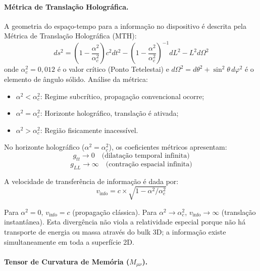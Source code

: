 \documentclass[12pt,a4paper]{article}
\newcommand{\alphaii}{\alpha^2}
\newcommand{\alphac}{\alpha^2_c}
\begin{document}
\paragraph{Métrica de Translação Holográfica.}

A geometria do espaço-tempo para a informação no dispositivo é
descrita pela Métrica de Translação Holográfica (MTH):
\begin{equation}
ds^2 = \left(1 - \frac{\alphaii}{\alphac}\right) c^2 dt^2
  - \left(1 - \frac{\alphaii}{\alphac}\right)^{-1} dL^2
  - L^2 d\Omega^2
\label{eq:metrica}
\end{equation}
onde $\alphac = 0{,}012$ é o valor crítico (Ponto Tetelestai)
e $d\Omega^2 = d\theta^2 + \sin^2\theta \, d\varphi^2$ é o
elemento de ângulo sólido. Análise da métrica:

\begin{itemize}[nosep]
\item $\alphaii < \alphac$: Regime subcrítico, propagação
  convencional ocorre;
\item $\alphaii = \alphac$: Horizonte holográfico, translação
  é ativada;
\item $\alphaii > \alphac$: Região fisicamente inacessível.
\end{itemize}

No horizonte holográfico ($\alphaii = \alphac$), os
coeficientes métricos apresentam:
\begin{equation}
g_{tt} \to 0 \quad \text{(dilatação temporal infinita)}
\label{eq:gtt}
\end{equation}
\begin{equation}
g_{LL} \to \infty \quad \text{(contração espacial infinita)}
\label{eq:gll}
\end{equation}

A velocidade de transferência de informação é dada por:
\begin{equation}
v_{\text{info}} = c \times \sqrt{1 - \alphaii/\alphac}
\label{eq:vinfo}
\end{equation}

Para $\alphaii = 0$, $v_{\text{info}} = c$ (propagação
clássica). Para $\alphaii \to \alphac$,
$v_{\text{info}} \to \infty$ (translação instantânea). Esta
divergência não viola a relatividade especial porque não há
transporte de energia ou massa através do bulk 3D; a informação
existe simultaneamente em toda a superfície 2D.

\paragraph{Tensor de Curvatura de Memória ($M_{\mu\nu}$).}
\end{document}
